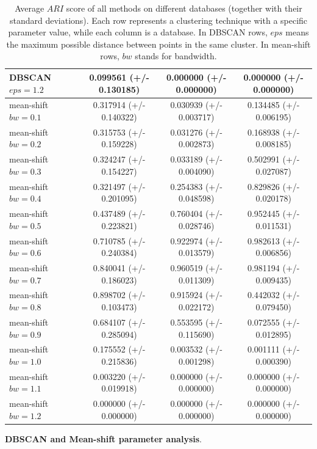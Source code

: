\documentclass[conference]{IEEEtran}
\begin{document}
\begin{table}[t]
\begin{tabular}{ | l*{4}{c} | }
    DBSCAN $eps = 1.2$   & \vline & 0.099561 (+/- 0.130185) & 0.000000 (+/- 0.000000) & 0.000000 (+/- 0.000000) \\
    \hline
    mean-shift $bw =0.1$ & \vline & 0.317914 (+/- 0.140322) & 0.030939 (+/- 0.003717) & 0.134485 (+/- 0.006195) \\
    mean-shift $bw =0.2$ & \vline & 0.315753 (+/- 0.159228) & 0.031276 (+/- 0.002873) & 0.168938 (+/- 0.008185) \\
    mean-shift $bw =0.3$ & \vline & 0.324247 (+/- 0.154227) & 0.033189 (+/- 0.004090) & 0.502991 (+/- 0.027087) \\
    mean-shift $bw =0.4$ & \vline & 0.321497 (+/- 0.201095) & 0.254383 (+/- 0.048598) & 0.829826 (+/- 0.020178) \\
    mean-shift $bw =0.5$ & \vline & 0.437489 (+/- 0.223821) & 0.760404 (+/- 0.028746) & 0.952445 (+/- 0.011531) \\
    mean-shift $bw =0.6$ & \vline & 0.710785 (+/- 0.240384) & 0.922974 (+/- 0.013579) & 0.982613 (+/- 0.006856) \\
    mean-shift $bw =0.7$ & \vline & 0.840041 (+/- 0.186023) & 0.960519 (+/- 0.011309) & 0.981194 (+/- 0.009435) \\
    mean-shift $bw =0.8$ & \vline & 0.898702 (+/- 0.103473) & 0.915924 (+/- 0.022172) & 0.442032 (+/- 0.079450) \\
    mean-shift $bw =0.9$ & \vline & 0.684107 (+/- 0.285094) & 0.553595 (+/- 0.115690) & 0.072555 (+/- 0.012895) \\
    mean-shift $bw =1.0$ & \vline & 0.175552 (+/- 0.215836) & 0.003532 (+/- 0.001298) & 0.001111 (+/- 0.000390) \\
    mean-shift $bw =1.1$ & \vline & 0.003220 (+/- 0.019918) & 0.000000 (+/- 0.000000) & 0.000000 (+/- 0.000000) \\
    mean-shift $bw =1.2$ & \vline & 0.000000 (+/- 0.000000) & 0.000000 (+/- 0.000000) & 0.000000 (+/- 0.000000) \\
    \hline
  \end{tabular}
  \caption{Average $ARI$ score of all methods on different databases (together with their standard deviations). Each row represents a clustering technique with a specific parameter value, while each column is a database. In DBSCAN rows, $eps$ means the maximum possible distance between points in the same cluster. In mean-shift rows, $bw$ stands for bandwidth. }
  \label{scores_table}
\end{table}

\textbf{DBSCAN and Mean-shift parameter analysis}.
\end{document}

